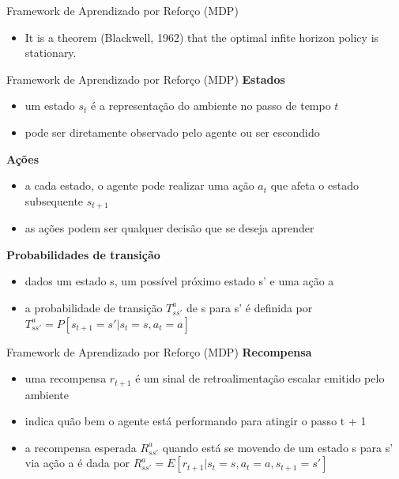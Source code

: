 \begin{frame}{Framework de Aprendizado por Reforço (MDP)}
    \begin{itemize}
        
        \item It is a theorem (Blackwell, 1962) that the optimal infite horizon policy is stationary. \nocite{thesis600} %
        
        
    \end{itemize}
\end{frame}

\begin{frame}{Framework de Aprendizado por Reforço (MDP)}
    \textbf{Estados}
    \begin{itemize}
        \item um estado $s_t$ é a representação do ambiente no passo de tempo $t$
        \item pode ser diretamente observado pelo agente ou ser escondido
    \end{itemize}
    \textbf{Ações}
    \begin{itemize}
        \item a cada estado, o agente pode realizar uma ação $a_t$ que afeta o estado subsequente $s_{t+1}$
        \item as ações podem ser qualquer decisão que se deseja aprender
    \end{itemize}
    \textbf{Probabilidades de transição}
    \begin{itemize}
        \item dados um estado s, um possível próximo estado s' e uma ação a
        \item a probabilidade de transição $T_{ss'}^{a}$ de s para s' é definida por $T_{ss'}^{a} = P[s_{t+1} = s' | s_t = s, a_t = a]$
    \end{itemize}
\end{frame}

\begin{frame}{Framework de Aprendizado por Reforço (MDP)}
    \textbf{Recompensa}
    \begin{itemize}
        \item uma recompensa $r_{t+1}$ é um sinal de \alert{retroalimentação} escalar emitido pelo ambiente
        \item indica quão bem o agente está performando para atingir o passo t + 1
        \item a\alert{ recompensa esperada $R_{ss'}^{a}$} quando está se movendo de um estado s para s' via ação a é dada por $R_{ss'}^{a} = E[r_{t+1} | s_t = s, a_t = a, s_{t+1}=s']$
    \end{itemize}
\end{frame}
    
    
    
    